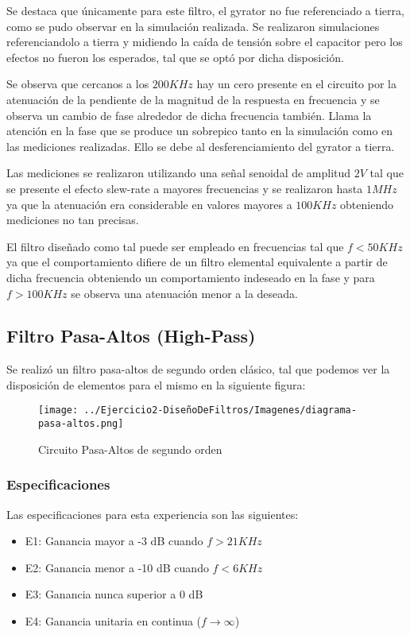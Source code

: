 Se destaca que únicamente para este filtro, el gyrator no fue referenciado a tierra, como se pudo observar en la simulación realizada. Se realizaron simulaciones referenciandolo a tierra y midiendo la caída de tensión
sobre el capacitor pero los efectos no fueron los esperados, tal que se optó por dicha disposición.

Se observa que cercanos a los $200KHz$ hay un cero presente en el circuito por la atenuación de la pendiente de la magnitud de la respuesta en frecuencia y se observa
un cambio de fase alrededor de dicha frecuencia también. Llama la atención en la fase que se produce un sobrepico tanto en la simulación como en las mediciones realizadas.
Ello se debe al desferenciamiento del gyrator a tierra.

Las mediciones se realizaron utilizando una señal senoidal de amplitud $2V$ tal que se presente el efecto slew-rate a mayores frecuencias y se realizaron
hasta $1MHz$ ya que la atenuación era considerable en valores mayores a $100 KHz$ obteniendo mediciones no tan precisas.

El filtro diseñado como tal puede ser empleado en frecuencias tal que $f < 50 KHz$ ya que el comportamiento difiere de un filtro elemental equivalente a partir de dicha
frecuencia obteniendo un comportamiento indeseado en la fase y para $f > 100 KHz$ se observa una atenuación menor a la deseada. 


\subsection{Filtro Pasa-Altos (High-Pass)}

Se realizó un filtro pasa-altos de segundo orden clásico, tal que podemos
ver la disposición de elementos para el mismo en la siguiente figura:

\begin{figure}[H]
    \centering
    \texttt{[image: ../Ejercicio2-DiseñoDeFiltros/Imagenes/diagrama-pasa-altos.png]}
    \caption{Circuito Pasa-Altos de segundo orden}
\end{figure}

\subsubsection{Especificaciones}

Las especificaciones para esta experiencia son las siguientes:

\begin{itemize}
	\item E1: Ganancia mayor a -3 dB cuando $f > 21 KHz$ 
	\item E2: Ganancia menor a -10 dB cuando $f < 6 KHz $
	\item E3: Ganancia nunca superior a 0 dB
	\item E4: Ganancia unitaria en continua ($f \to \infty$)
\end{itemize}

